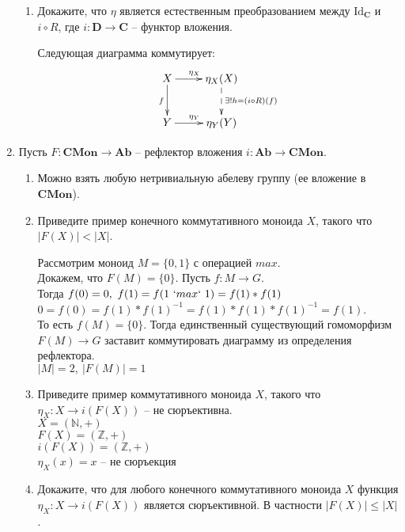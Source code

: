 \documentclass[draft]{article}
\newcommand{\cat}[1]{\mathbf{#1}}
\renewcommand{\C}{\cat{C}}
\newcommand{\D}{\cat{D}}
\newcommand{\CMon}{\cat{CMon}}
\newcommand{\Ab}{\cat{Ab}}
\newcommand{\fs}[1]{\mathrm{#1}}
\begin{document}
\begin{enumerate}
\begin{enumerate}
\item Докажите, что $\eta$ является естественным преобразованием между $\fs{Id}_\C$ и $i \circ R$, где $i : \D \to \C$ -- функтор вложения.

Следующая диаграмма коммутирует:
\[
\xymatrix{
X \ar[r]^{\eta_X} \ar[d]_{f} & \eta_X(X) \ar@{-->}[d]^{\exists!h = (i \circ R) (f)} \\
Y \ar[r]^{\eta_Y} &  \eta_Y(Y)
}
\]
\end{enumerate}

\item Пусть $F : \CMon \to \Ab$ -- рефлектор вложения $i : \Ab \to \CMon$.
\begin{enumerate}
\item {}

Можно взять любую нетривиальную абелеву группу (ее вложение в $\CMon$).
\item Приведите пример конечного коммутативного моноида $X$, такого что $|F(X)| < |X|$.

Рассмотрим моноид $M = \{0, 1\}$ с операцией $max$.\\
Докажем, что $F(M) = \{0\}$. Пусть $f : M \to G$. \\
Тогда $f(0) = 0,~f(1) = f(1 ~`max`~ 1) = f(1)\ast f(1)$\\
$0 = f(0) = f(1) \ast f(1)^{-1} = f(1) \ast  f(1) \ast f(1)^{-1} = f(1)$. \\
То есть $f(M) = \{0\}$. Тогда единственный существующий гомоморфизм $F(M) \to G$ заставит коммутировать диаграмму из определения рефлектора.\\

$|M| = 2, ~|F(M)| = 1$


\item Приведите пример коммутативного моноида $X$, такого что $\eta_X : X \to i(F(X))$ -- не сюръективна.\\

$X = (\mathbb{N}, +)$\\
$F(X) = (\mathbb{Z}, +)$\\
$i(F(X)) = (\mathbb{Z}, +)$\\
$\eta_X(x) = x$ -- не сюръекция

\item Докажите, что для любого конечного коммутативного моноида $X$ функция $\eta_X : X \to i(F(X))$ является сюръективной. В частности $|F(X)| \leq |X|$.\\


\end{enumerate}
\end{enumerate}
\end{document}
